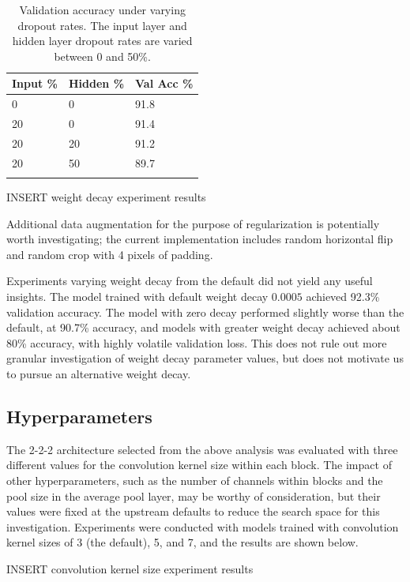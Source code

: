 \documentclass[letterpaper]{article} %
\begin{document}
\begin{table}[b]
\centering
\begin{tabular}{|l|l|l|}
    \firsthline
    Input \% & Hidden \% & Val Acc \%    \\
    \hline
    0 & 0 & 91.8    \\
    20 & 0 & 91.4    \\
    20 & 20 & 91.2    \\
    20 & 50 & 89.7    \\
    \lasthline
\end{tabular}
\caption{Validation accuracy under varying dropout rates. The input layer and hidden layer dropout rates are varied between 0 and 50\%.}
\label{table3}
\end{table}

INSERT weight decay experiment results


Additional data augmentation for the purpose of regularization is potentially worth investigating; the current
implementation includes random horizontal flip and random crop with 4 pixels of padding.

Experiments varying weight decay from the default  did not yield any useful insights.
The model trained with default weight decay $ 0.0005 $ achieved 92.3\% validation accuracy.
The model with zero decay performed slightly worse than the default, at 90.7\% accuracy, and
models with greater weight decay achieved about 80\% accuracy, with highly volatile validation
loss.
This does not rule out more granular investigation of weight decay parameter values, but does not
motivate us to pursue an alternative weight decay.

\subsection{Hyperparameters}

The 2-2-2 architecture selected from the above analysis was evaluated with three different values for the convolution
kernel size within each block.
The impact of other hyperparameters, such as the number of channels within blocks and the pool size in the average pool
layer, may be worthy of consideration, but their values were fixed at the upstream defaults to reduce the search space
for this investigation.
Experiments were conducted with models trained with convolution kernel sizes of 3 (the default), 5, and 7, and the
results are shown below.

INSERT convolution kernel size experiment results
\end{document}
